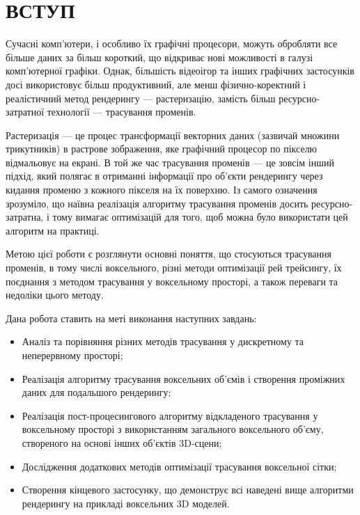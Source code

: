 \chapter*{ВСТУП}

Сучасні комп'ютери, і особливо їх графічні процесори, можуть обробляти все більше даних за більш короткий, що відкриває нові можливості в галузі комп'ютерної графіки. Однак, більшість відеоігор та інших графічних застосунків досі використовує більш продуктивний, але менш фізично-коректний і реалістичний метод рендерингу --- растеризацію, замість більш ресурсно-затратної технології --- трасування променів.

Растеризація --- це процес трансформації векторних даних (зазвичай множини трикутників) в растрове зображення, яке графічний процесор по пікселю відмальовує на екрані. В той же час трасування променів  --- це зовсім інший підхід, який полягає в отриманні інформації про об'єкти рендерингу через кидання променю з кожного пікселя на їх поверхню. Із самого означення зрозуміло, що наївна реалізація алгоритму трасування променів досить ресурсно-затратна, і тому вимагає оптимізацій для того, щоб можна було використати цей алгоритм на практиці.

Метою цієї роботи є розглянути основні поняття, що стосуються трасування променів, в тому числі воксельного, різні методи оптимізації рей трейсингу, їх поєднання з методом трасування у воксельному просторі, а також переваги та недоліки цього методу.

Дана робота ставить на меті виконання наступних завдань:

\begin{itemize}[itemsep=0pt, topsep=0pt, label=$\diamond$]
    \item Аналіз та порівняння різних методів трасування у дискретному та неперервному просторі;
    \item Реалізація алгоритму трасування воксельних об'ємів і створення проміжних даних для подальшого рендерингу;
    \item Реалізація пост-процесингового алгоритму відкладеного  трасування у воксельному просторі з використанням загального воксельного об'єму, створеного на основі інших об'єктів 3D-сцени;
    \item Дослідження додаткових методів оптимізації трасування воксельної сітки;
    \item Створення кінцевого застосунку, що демонструє всі наведені вище алгоритми рендерингу на прикладі воксельних 3D моделей.
\end{itemize}